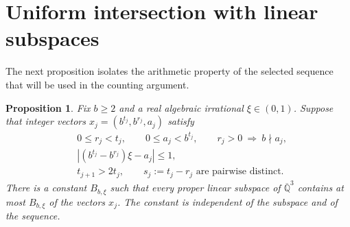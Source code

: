 \documentclass[11pt]{article}
\numberwithin{equation}{section}
\newtheorem{proposition}[theorem]{Proposition}
\theoremstyle{remark}
\newcommand{\Qbar}{\overline{\mathbb Q}}
\begin{document}
\section{Uniform intersection with linear subspaces}\label{sec:occupancy}

The next proposition isolates the arithmetic property of the selected
sequence that will be used in the counting argument.

\begin{proposition}\label{prop:occupancy}
Fix $b\ge2$ and a real algebraic irrational $\xi\in(0,1)$.
Suppose that integer vectors
$x_j=(b^{t_j},b^{r_j},a_j)$ satisfy
\begin{align}
 &0\le r_j<t_j,\qquad 0\le a_j<b^{t_j},\qquad
 r_j>0\ \Longrightarrow\ b\nmid a_j,\label{eq:occ1}\\
 &|(b^{t_j}-b^{r_j})\xi-a_j|\le1,\label{eq:occ2}\\
 &t_{j+1}>2t_j,\qquad
 s_j:=t_j-r_j\text{ are pairwise distinct}.\label{eq:occ3}
\end{align}
There is a constant $B_{b,\xi}$ such that every proper linear subspace
of $\Qbar^3$ contains at most $B_{b,\xi}$ of the vectors $x_j$.
The constant is independent of the subspace and of the sequence.
\end{proposition}
\end{document}
